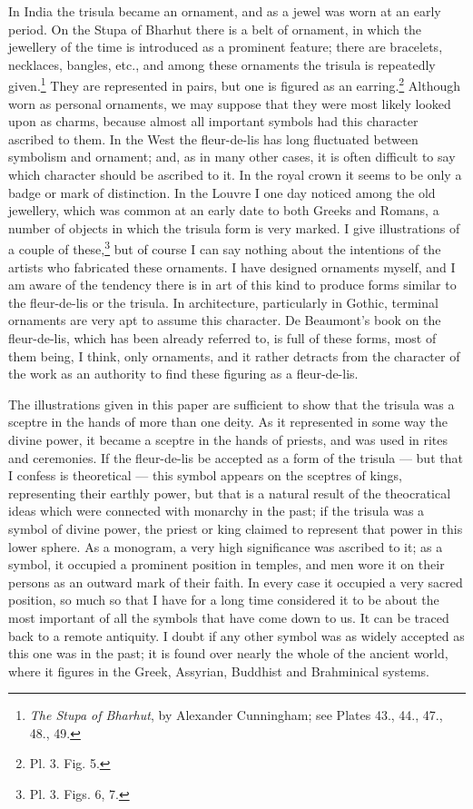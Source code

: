 \documentclass[a4paper, 11pt, oneside, english, landscape, twocolumn]{article}
\begin{document}
In India the trisula became an ornament, and as a jewel was worn at an early period. On the Stupa of Bharhut there is a belt of ornament, in which the jewellery of the time is introduced as a prominent feature; there are bracelets, necklaces, bangles, etc., and among these ornaments the trisula is repeatedly given.\footnote{\emph{The Stupa of Bharhut}, by Alexander Cunningham; see Plates 43., 44., 47., 48., 49.} They are represented in pairs, but one is figured as an earring.\footnote{Pl. 3. Fig. 5.} Although worn as personal ornaments, we may suppose that they were most likely looked upon as charms, because almost all important symbols had this character ascribed to them. In the West the fleur-de-lis has long fluctuated between symbolism and ornament; and, as in many other cases, it is often difficult to say which character should be ascribed to it. In the royal crown it seems to be only a badge or mark of distinction. In the Louvre I one day noticed among the old jewellery, which was common at an early date to both Greeks and Romans, a number of objects in which the trisula form is very marked. I give illustrations of a couple of these,\footnote{Pl. 3. Figs. 6, 7.} but of course I can say nothing about the intentions of the artists who fabricated these ornaments. I have designed ornaments myself, and I am aware of the tendency there is in art of this kind to produce forms similar to the fleur-de-lis or the trisula. In architecture, particularly in Gothic, terminal ornaments are very apt to assume this character. De Beaumont's book on the fleur-de-lis, which has been already referred to, is full of these forms, most of them being, I think, only ornaments, and it rather detracts from the character of the work as an authority to find these figuring as a fleur-de-lis.

The illustrations given in this paper are sufficient to show that the trisula was a sceptre in the hands of more than one deity. As it represented in some way the divine power, it became a sceptre in the hands of priests, and was used in rites and ceremonies. If the fleur-de-lis be accepted as a form of the trisula --- but that I confess is theoretical --- this symbol appears on the sceptres of kings, representing their earthly power, but that is a natural result of the theocratical ideas which were connected with monarchy in the past; if the trisula was a symbol of divine power, the priest or king claimed to represent that power in this lower sphere. As a monogram, a very high significance was ascribed to it; as a symbol, it occupied a prominent position in temples, and men wore it on their persons as an outward mark of their faith. In every case it occupied a very sacred position, so much so that I have for a long time considered it to be about the most important of all the symbols that have come down to us. It can be traced back to a remote antiquity. I doubt if any other symbol was as widely accepted as this one was in the past; it is found over nearly the whole of the ancient world, where it figures in the Greek, Assyrian, Buddhist and Brahminical systems.
\end{document}
